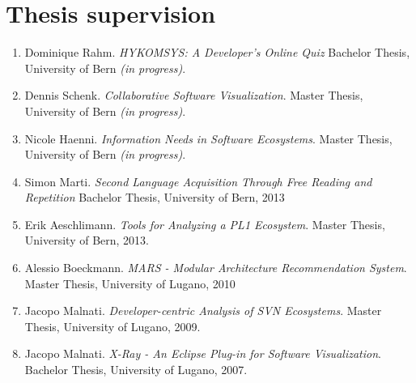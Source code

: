 \section{Thesis supervision \period}

\begin{enumerate}

\item Dominique Rahm. \emph{HYKOMSYS: A Developer's Online Quiz} Bachelor Thesis, University of Bern \emph{(in progress)}.

\item Dennis Schenk. \emph{Collaborative Software Visualization}. Master Thesis, University of Bern \emph{(in progress)}.

\item Nicole Haenni. \emph {Information Needs in Software Ecosystems}. Master Thesis, University of Bern \emph{(in progress)}.

\item Simon Marti. \emph{Second Language Acquisition Through Free Reading and Repetition} Bachelor Thesis, University of Bern, 2013

\item Erik Aeschlimann. \emph {Tools for Analyzing a PL1 Ecosystem}. Master Thesis, University of Bern, 2013.

\item Alessio Boeckmann. \emph{MARS - Modular Architecture Recommendation System}. Master Thesis, University of Lugano, 2010

\item Jacopo Malnati. \emph{Developer-centric Analysis of SVN Ecosystems}. Master Thesis, University of Lugano, 2009.

\item Jacopo Malnati. \emph{X-Ray - An Eclipse Plug-in for Software Visualization}. Bachelor Thesis, University of Lugano, 2007.

\end{enumerate}